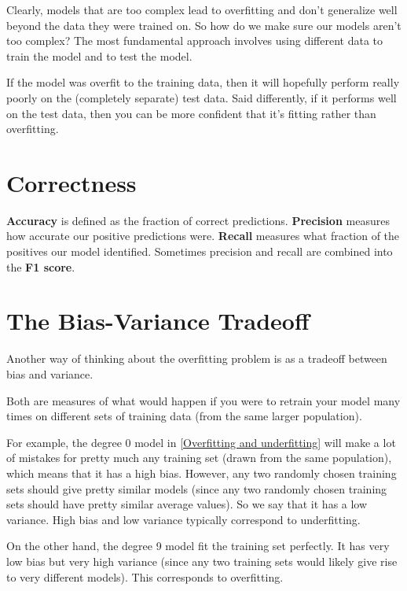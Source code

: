 
Clearly, models that are too complex lead to overfitting and don't generalize well
beyond the data they were trained on. So how do we make sure our models aren't too
complex? The most fundamental approach involves using different data to train the
model and to test the model.

If the model was overfit to the training data, then it will hopefully perform really
poorly on the (completely separate) test data. Said differently, if it performs well on
the test data, then you can be more confident that it's fitting rather than overfitting.

\section{Correctness}

\textbf{Accuracy} is defined as the fraction of correct predictions. \textbf{Precision} measures
how accurate our positive predictions were. \textbf{Recall} measures what fraction of the positives our model identified. Sometimes precision and recall are combined into the \textbf{F1 score}.

\section{The Bias-Variance Tradeoff}

Another way of thinking about the overfitting problem is as a tradeoff between bias
and variance.

Both are measures of what would happen if you were to retrain your model many
times on different sets of training data (from the same larger population).

For example, the degree 0 model in \autoref{Overfitting and underfitting} will
make a lot of mistakes for pretty much any training set (drawn from the same population), which means that it has a high bias. However, any two randomly chosen training sets should give pretty similar models (since any two randomly chosen training sets should have pretty similar average values). So we say that it has a low variance. High bias and low variance typically correspond to underfitting.

On the other hand, the degree 9 model fit the training set perfectly. It has very low
bias but very high variance (since any two training sets would likely give rise to very
different models). This corresponds to overfitting.

